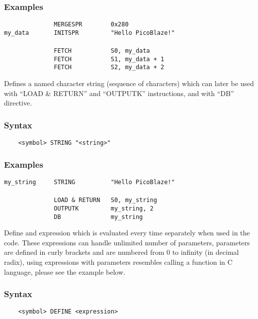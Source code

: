     \subsubsection{Examples}
        \verb'              MERGESPR        0x280'\\
        \verb'my_data       INITSPR         "Hello PicoBlaze!"'\\
        \verb''\\
        \verb'              FETCH           S0, my_data'\\
        \verb'              FETCH           S1, my_data + 1'\\
        \verb'              FETCH           S2, my_data + 2'

    Defines a named character string (sequence of characters) which can later be used with ``LOAD \& RETURN'' and ``OUTPUTK'' instructions, and with ``DB'' directive.

    \subsubsection{Syntax}
        \verb'    <symbol> STRING "<string>"'

    \subsubsection{Examples}
        \verb'my_string     STRING          "Hello PicoBlaze!"'\\
        \verb''\\
        \verb'              LOAD & RETURN   S0, my_string'\\
        \verb'              OUTPUTK         my_string, 2'\\
        \verb'              DB              my_string'

    Define and expression which is evaluated every time separately when used in the code. These expressions can handle unlimited number of parameters, parameters are defined in curly brackets and are numbered from 0 to infinity (in decimal radix), using expressions with parameters resembles calling a function in C language, please see the example below.

    \subsubsection{Syntax}
        \verb'    <symbol> DEFINE <expression>'

